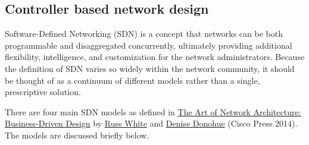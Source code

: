 \subsection{Controller based network design}
Software-Defined Networking (SDN) is a concept that networks can be both
programmable and disaggregated concurrently, ultimately providing additional
flexibility, intelligence, and customization for the network administrators.
Because the definition of SDN varies so widely within the network community,
it should be thought of as a continuum of different models rather than a
single, prescriptive solution.

There are four main SDN models as defined in
\href{http://www.ciscopress.com/store/art-of-network-architecture-business-driven-design-9780133259230}{The Art of Network Architecture: Business-Driven Design} by
\href{https://twitter.com/rtggeek}{Russ White} and
\href{ihttps://twitter.com/LadyNetwkr}{Denise Donohue} (Cisco Press 2014).
The models are discussed briefly below.

